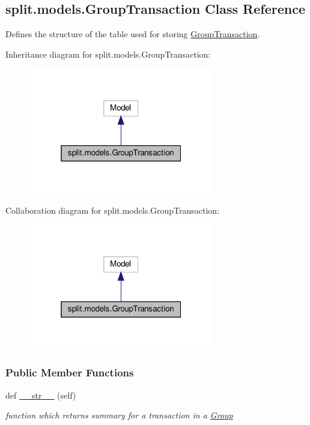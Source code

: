 \hypertarget{classsplit_1_1models_1_1GroupTransaction}{}\subsection{split.\+models.\+Group\+Transaction Class Reference}
\label{classsplit_1_1models_1_1GroupTransaction}


Defines the structure of the table used for storing \hyperlink{classsplit_1_1models_1_1GroupTransaction}{Group\+Transaction}.  




Inheritance diagram for split.\+models.\+Group\+Transaction\+:\nopagebreak
\begin{figure}[H]
\begin{center}
\leavevmode
\includegraphics[width=229pt]{classsplit_1_1models_1_1GroupTransaction__inherit__graph}
\end{center}
\end{figure}


Collaboration diagram for split.\+models.\+Group\+Transaction\+:\nopagebreak
\begin{figure}[H]
\begin{center}
\leavevmode
\includegraphics[width=229pt]{classsplit_1_1models_1_1GroupTransaction__coll__graph}
\end{center}
\end{figure}
\subsubsection*{Public Member Functions}
\begin{DoxyCompactItemize}
\item 
def \hyperlink{classsplit_1_1models_1_1GroupTransaction_ab2fdfa9cdc899dbb3296e06e16e217fd}{\+\_\+\+\_\+str\+\_\+\+\_\+} (self)
\begin{DoxyCompactList}\small\item\em function which returns summary for a transaction in a \hyperlink{classsplit_1_1models_1_1Group}{Group} \end{DoxyCompactList}\end{DoxyCompactItemize}
